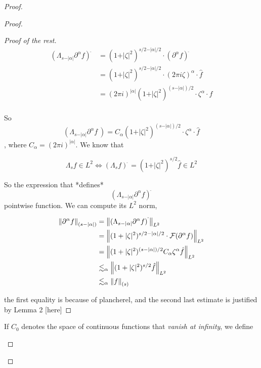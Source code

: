 \documentclass[../main-manifolds.tex]{subfiles}
\begin{document}
{{\begin{proof}
{{\begin{proof}
\begin{proof}[Proof of the rest]
$$
\begin{align}
(\Lambda_{s-\vert\alpha\vert}\partial^\alpha f)^{\hat{\:}} &= (1+\vert\zeta\vert^2)^{s/2 - \vert\alpha\vert/2}\cdot(\partial^\alpha f)^{\hat{\:}}\\
&= (1+\vert\zeta\vert^2)^{s/2 - \vert\alpha\vert/2}\cdot(2\pi i \zeta)^{\alpha}
\cdot \hat{f}\\
&= (2\pi i)^{\vert\alpha\vert}(1+\vert\zeta\vert^2)^{(s-\vert\alpha\vert)/2}\cdot \zeta^\alpha\cdot\hat{f}\\
\end{align}
$$

So $$({\Lambda_{s-\vert\alpha\vert}\partial^\alpha f}^{\hat{\:}}) = C_{\alpha} (1+\vert\zeta\vert^2)^{(s-\vert\alpha\vert)/2}\cdot \zeta^\alpha \cdot\hat{f}$$, where $C_\alpha = (2\pi i)^{\vert\alpha\vert}$. We know that 

$$
\Lambda_s f\in L^2\iff (\Lambda_s f)^{\hat{\:}} = (1+\vert\zeta\vert^2)^{s/2}\hat{f}\in L^2
$$

So the expression that *defines* $$(\Lambda_{s-\vert\alpha\vert}\partial^\alpha f)^{\hat{\:}}$$ pointwise function. We can compute its $L^2$ norm, 

$$
\begin{align}
\norm{\partial^{\alpha}f}_{(s-\vert\alpha\vert)} &=\norm{(\Lambda_{s-\vert\alpha\vert}\partial^\alpha f)^{\hat{\:}}}_{L^2}\\
&= \norm{(1+\vert\zeta\vert^2)^{s/2 - \vert\alpha\vert/2}\cdot\mathcal{F}(\partial^\alpha f)}_{L^2}\\
&= \norm{(1+\vert\zeta\vert^2)^{(s-\vert\alpha\vert)/2}C_{\alpha}\zeta^{\alpha}\hat{f}}_{L^2}\\
&\lesssim_{\alpha}\norm{(1+\vert\zeta\vert^2)^{s/2}\hat{f}}_{L^2}\\
&\lesssim_{\alpha}\norm{f}_{(s)}
\end{align}
$$

the first equality is because of plancherel, and the second last estimate is justified by Lemma 2 [here]

\end{proof}


\begin{definition}
If $C_0$ denotes the space of continuous functions that \emph{vanish at infinity}, we define


\end{definition}
\end{proof}}}
\end{proof}}}
\end{document}
